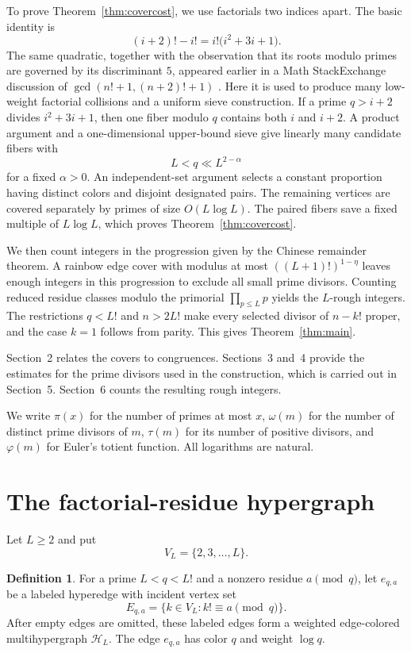 \documentclass[11pt]{amsart}
\theoremstyle{definition}
\newtheorem{definition}[theorem]{Definition}
\theoremstyle{remark}
\begin{document}
To prove Theorem~\ref{thm:covercost}, we use factorials two indices apart.
The basic identity is
\begin{equation}\label{eq:keyidentity}
(i+2)!-i!=i!\bigl(i^2+3i+1\bigr).
\end{equation}
The same quadratic, together with the observation that its roots modulo
primes are governed by its discriminant $5$, appeared earlier in a
Math StackExchange discussion of
$\gcd(n!+1,(n+2)!+1)$ \cite{Israel}.  Here it is used to produce many
low-weight factorial collisions and a uniform sieve construction.
If a prime $q>i+2$ divides $i^2+3i+1$, then one fiber modulo $q$ contains
both $i$ and $i+2$.  A product argument and a one-dimensional upper-bound
sieve give linearly many candidate fibers with
\[
L<q\ll L^{2-\alpha}
\]
for a fixed $\alpha>0$.  An independent-set argument selects a constant
proportion having distinct colors and disjoint designated pairs.  The
remaining vertices are covered separately by primes of size $O(L\log L)$.
The paired fibers save a fixed multiple of $L\log L$, which proves
Theorem~\ref{thm:covercost}.

We then count integers in the progression given by the Chinese remainder
theorem.  A rainbow edge cover with modulus at most $((L+1)!)^{1-\eta}$
leaves enough integers in this progression to exclude all small prime
divisors.  Counting reduced residue classes modulo the primorial
$\prod_{p\leq L}p$ yields the $L$-rough integers.  The restrictions
$q<L!$ and $n>2L!$ make every selected divisor of $n-k!$ proper, and the
case $k=1$ follows from parity.  This gives Theorem~\ref{thm:main}.

Section~2 relates the covers to congruences.  Sections~3 and~4 provide the
estimates for the prime divisors used in the construction, which is carried
out in Section~5.  Section~6 counts the resulting rough integers.

We write $\pi(x)$ for the number of primes at most $x$, $\omega(m)$ for the
number of distinct prime divisors of $m$, $\tau(m)$ for its number of
positive divisors, and $\varphi(m)$ for Euler's totient function.  All
logarithms are natural.

\section{The factorial-residue hypergraph}

Let $L\geq2$ and put
\[
V_L=\{2,3,\ldots,L\}.
\]

\begin{definition}\label{def:fibres}
For a prime $L<q<L!$ and a nonzero residue $a\pmod q$, let $e_{q,a}$ be a
labeled hyperedge with incident vertex set
\[
E_{q,a}=\{k\in V_L:k!\equiv a\pmod q\}.
\]
After empty edges are omitted, these labeled edges form a weighted
edge-colored multihypergraph $\mathcal H_L$.  The edge $e_{q,a}$ has color
$q$ and weight $\log q$.
\end{definition}
\end{document}
